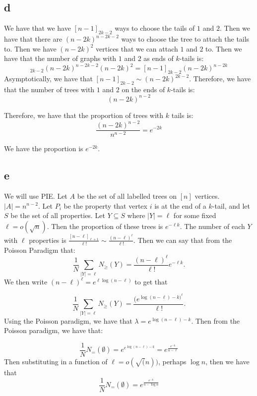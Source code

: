 \documentclass[]{article}
\begin{document}
\subsection{d}

We have that we have $[n - 1]_{2k - 2}$ ways to choose the tails of $1$ and $2$. Then we have that there are $(n- 2k)^{n - 2k - 2}$ ways to choose the tree to attach the tails to. Then we have $(n - 2k)^2$ vertices that we can attach $1 $ and $2$ to. Then we have that the number of graphs with $1$ and $2$ as ends of $k$-tails is:
\begin{equation}
	[n - 1]_{2k - 2} (n - 2k)^{n - 2k - 2}(n - 2k)^2 = [n - 1]_{2k - 2} (n - 2k)^{n - 2k}
\end{equation}
Asymptotically, we have that $[n - 1]_{2k - 2} \sim (n - 2k)^{2k - 2}$. Therefore, we have that the number of trees with $1$ and $2$ on the ends of $k$-tails is:
\begin{equation}
	(n - 2k)^{n - 2}
\end{equation}

Therefore, we have that the proportion of trees with $k$ tails is:
\begin{equation}
	\frac{(n - 2k)^{n - 2}}{n^{n - 2}} = e^{-2k}
\end{equation}

We have the proportion is $e^{-2k}$. 

\subsection{e}
We will use PIE. Let $A$ be the set of all labelled trees on $[n]$ vertices. $|A| = n^{n - 2}$. Let $P_i$ be the property that vertex $i$ is at the end of a $k$-tail, and let $S$ be the set of all properties. Let $Y \subseteq S$ where $|Y| = \ell$ for some fixed $\ell = o(\sqrt{n}) $. Then the proportion of these trees is $e^{-\ell k}$. The number of each $Y$ with $\ell$ properties is $\frac{[n - \ell]_{\ell + 1}}{\ell!} \sim \frac{(n - \ell)^\ell}{\ell!}$. Then we can say that from the Poisson Paradigm that:
\begin{equation}
	\frac{1}{N}\sum_{|Y| = \ell}N_\geq(Y) = \frac{(n - \ell)^\ell}{\ell!} e^{-\ell k}.
\end{equation}
We then write $(n - \ell)^\ell = e^{\ell \log(n - \ell)}$ to get that 

\begin{equation}
	\frac{1}{N}\sum_{|Y| = \ell}N_\geq(Y) = \frac{(e^{\log(n - \ell) - k)^\ell}}{\ell!}.
\end{equation}
Using the Poisson paradigm, we have that $\lambda = e^{\log(n - \ell) - k}$. 
Then from the Poisson paradigm, we have that:

\begin{equation}
	\frac{1}{N}N_= (\emptyset) = e^{e^{\log(n - \ell) - k}} = e^{\frac{e^{-k}}{n - \ell}}
\end{equation}
Then substituting in a function of $\ell = o(\sqrt(n))$, perhaps $\log n$, then we have that 
\begin{equation}
	\frac{1}{N}N_= (\emptyset)= e^{\frac{e^{-k}}{n - \log n}}
\end{equation}
\end{document}
